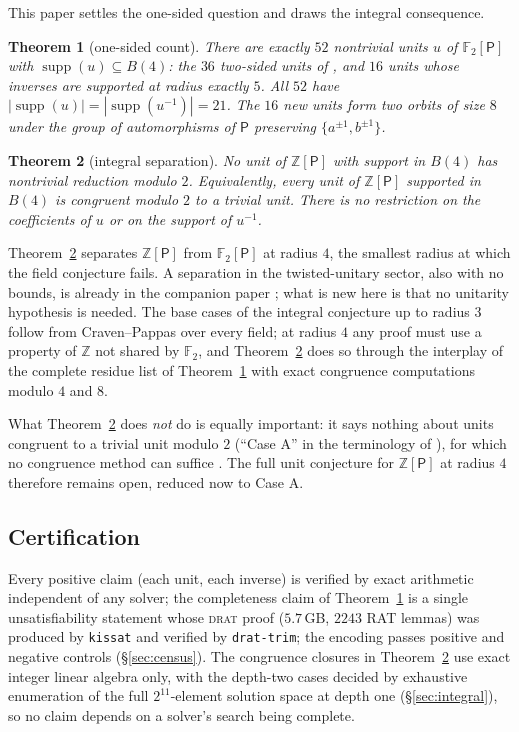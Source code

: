 \documentclass[11pt]{amsart}
\newtheorem{theorem}{Theorem}[section]
\theoremstyle{definition}
\newcommand{\F}{\mathbb{F}}
\newcommand{\Z}{\mathbb{Z}}
\renewcommand{\P}{\mathsf{P}}
\newcommand{\Ball}[1]{B(#1)}
\newcommand{\supp}{\operatorname{supp}}
\begin{document}
This paper settles the one-sided question and draws the integral consequence.

\begin{theorem}[one-sided count]\label{thm:census}
There are exactly $52$ nontrivial units $u$ of $\F_2[\P]$ with
$\supp(u)\subseteq\Ball4$: the $36$ two-sided units of \cite{DLNV2026}, and
$16$ units whose inverses are supported at radius exactly $5$. All $52$ have
$|\supp(u)|=|\supp(u^{-1})|=21$. The $16$ new units form two orbits of size
$8$ under the group of automorphisms of $\P$ preserving
$\{a^{\pm1},b^{\pm1}\}$.
\end{theorem}

\begin{theorem}[integral separation]\label{thm:integral}
No unit of $\Z[\P]$ with support in $\Ball4$ has nontrivial reduction modulo
$2$. Equivalently, every unit of $\Z[\P]$ supported in $\Ball4$ is congruent
modulo $2$ to a trivial unit. There is no restriction on the coefficients of
$u$ or on the support of $u^{-1}$.
\end{theorem}

Theorem~\ref{thm:integral} separates $\Z[\P]$ from $\F_2[\P]$ at radius $4$,
the smallest radius at which the field conjecture fails. A separation in the
twisted-unitary sector, also with no bounds, is already in the companion paper
\cite{Tabei5}; what is new here is that no unitarity hypothesis is needed. The base cases of the integral conjecture up
to radius $3$ follow from Craven--Pappas \cite{CravenPappas2013} over every
field; at radius $4$ any proof must use a property of $\Z$ not shared by
$\F_2$, and Theorem~\ref{thm:integral} does so through the interplay of the
complete residue list of Theorem~\ref{thm:census} with exact congruence
computations modulo $4$ and $8$.

What Theorem~\ref{thm:integral} does \emph{not} do is equally important: it
says nothing about units congruent to a trivial unit modulo $2$ (``Case A'' in
the terminology of \cite{Tabei4}), for which no congruence method can suffice
\cite{Bartholdi2022}. The full unit conjecture for $\Z[\P]$ at radius
$4$ therefore remains open, reduced now to Case A.

\subsection*{Certification} Every positive claim (each unit, each inverse) is
verified by exact arithmetic independent of any solver; the completeness claim
of Theorem~\ref{thm:census} is a single unsatisfiability statement whose
\textsc{drat} proof ($5.7$\,GB, $2243$ RAT lemmas) was produced by
\texttt{kissat} and verified by \texttt{drat-trim}; the encoding passes
positive and negative controls (\S\ref{sec:census}). The congruence closures in
Theorem~\ref{thm:integral} use exact integer linear algebra only, with the
depth-two cases decided by exhaustive enumeration of the full $2^{11}$-element
solution space at depth one (\S\ref{sec:integral}), so no claim depends on a
solver's search being complete.
\end{document}
